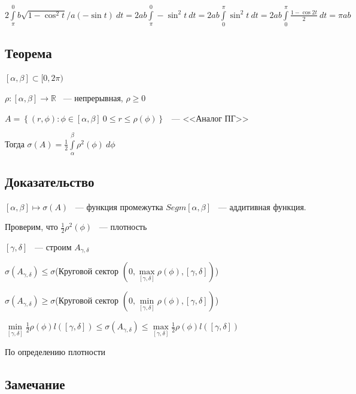 \documentclass{article}
\begin{document}
            $2 \int\limits^0_{\pi} b \sqrt{1 - \cos^2 t} / a(-\sin t) \ dt = 2 a b \int\limits^0_{\pi} - \sin^2 t \ dt = 2 a b \int\limits^{\pi}_{0} \sin^2 t \ dt = 2 a b \int\limits^{\pi}_{0} \frac{1 - \cos {2t}}{2} \ dt = \pi a b$
            
        \subsection{Теорема}
            
            $[\alpha, \beta] \subset [0, 2 \pi)$
            
            $\rho : [\alpha, \beta] \rightarrow \mathbb{R}$ ~--- непрерывная, $\rho \geq 0$
            
            $A = \left\{ (r, \phi) : \phi \in [\alpha, \beta] \ 0 \leq r \leq \rho(\phi) \right\}$ ~--- <<Аналог ПГ>>
            
            Тогда $\sigma(A) = \frac{1}{2} \int\limits^{\beta}_{\alpha} \rho^2(\phi) \ d \phi$
            
        \subsection{Доказательство}
        
            $[\alpha, \beta] \longmapsto \sigma(A)$ ~--- функция промежутка $Segm [\alpha, \beta]$ ~--- аддитивная функция.
            
            Проверим, что $\frac{1}{2} \rho^2 (\phi)$ ~--- плотность
            
            $[\gamma, \delta]$ ~--- строим $A_{\gamma{,} \delta}$
            
            $\sigma (A_{\gamma{,} \delta}) \leq \sigma$(Круговой сектор $(0, \max\limits_{[\gamma, \delta]} \rho(\phi), [\gamma, \delta])$)
            
            $\sigma (A_{\gamma{,} \delta}) \geq \sigma$(Круговой сектор $(0, \min\limits_{[\gamma, \delta]} \rho(\phi), [\gamma, \delta])$)
            
            $\min\limits_{[\gamma, \delta]} \frac{1}{2} \rho(\phi) l([\gamma, \delta]) \leq \sigma (A_{\gamma{,} \delta}) \leq \max\limits_{[\gamma, \delta]} \frac{1}{2} \rho(\phi) l([\gamma, \delta])$
            
            По определению плотности
            
        \subsection{Замечание}
        
\end{document}
